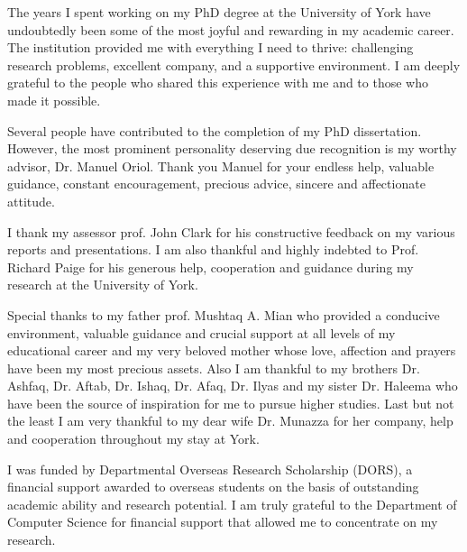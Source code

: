 

\begin{acknowledgements}      %

The years I spent working on my PhD degree at the University of York have undoubtedly been some of the most joyful and rewarding in my academic career. The institution provided me with everything I need to thrive: challenging research problems, excellent company, and a supportive environment. I am deeply grateful to the people who shared this experience with me and to those who made it possible. 

Several people have contributed to the completion of my PhD dissertation. However, the most prominent personality deserving due recognition is my worthy advisor, Dr. Manuel Oriol. Thank you Manuel for your endless help, valuable guidance, constant encouragement, precious advice, sincere and affectionate attitude.

I thank my assessor prof. John Clark for his constructive feedback on my various reports and presentations. I am also thankful and highly indebted to Prof. Richard Paige for his generous help, cooperation and guidance during my research at the University of York.

Special thanks to my father prof. Mushtaq A. Mian who provided a conducive environment, valuable guidance and crucial support at all levels of my educational career and my very beloved mother whose love, affection and prayers have been my most precious assets. Also I am thankful to my brothers Dr. Ashfaq, Dr. Aftab, Dr. Ishaq, Dr. Afaq, Dr. Ilyas and my sister Dr. Haleema who have been the source of inspiration for me to pursue higher studies. Last but not the least I am very thankful to my dear wife Dr. Munazza for her company, help and cooperation throughout my stay at York.

I was funded by Departmental Overseas Research Scholarship (DORS), a financial support awarded to overseas students on the basis of outstanding academic ability and research potential. I am truly grateful to the Department of Computer Science for financial support that allowed me to concentrate on my research.



\end{acknowledgements}


